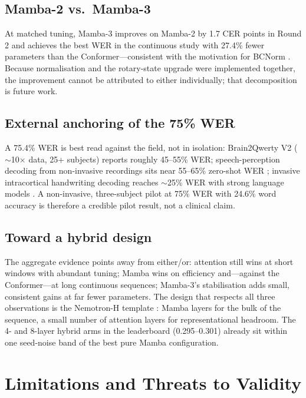 \documentclass[11pt,a4paper]{report}
\begin{document}
\section{Mamba-2 vs.\ Mamba-3}
At matched tuning, Mamba-3 improves on Mamba-2 by 1.7 CER points in Round 2
and achieves the best WER in the continuous study with 27.4\% fewer
parameters than the Conformer---consistent with the motivation for BCNorm
\citep{lahoti2026mamba3}. Because normalisation and the rotary-state upgrade
were implemented together, the improvement cannot be attributed to either
individually; that decomposition is future work.

\section{External anchoring of the 75\% WER}
A 75.4\% WER is best read against the field, not in isolation: Brain2Qwerty
V2 \citep{levy2026brain2qwertyv2} ($\sim$10$\times$ data, 25+ subjects)
reports roughly 45--55\% WER; speech-perception decoding from non-invasive recordings sits
near 55--65\% zero-shot WER \citep{defossez2023decoding}; invasive
intracortical handwriting decoding reaches $\sim$25\% WER with strong
language models \citep{willett2021handwriting}. A non-invasive, three-subject
pilot at 75\% WER with 24.6\% word accuracy is therefore a credible pilot
result, not a clinical claim.

\section{Toward a hybrid design}
The aggregate evidence points away from either/or: attention still wins at
short windows with abundant tuning; Mamba wins on efficiency and---against
the Conformer---at long continuous sequences; Mamba-3's stabilisation adds
small, consistent gains at far fewer parameters. The design that respects
all three observations is the Nemotron-H template \citep{nvidia2025nemotronh}:
Mamba layers for the bulk of the sequence, a small number of attention
layers for representational headroom. The 4- and 8-layer hybrid arms in the
leaderboard (0.295--0.301) already sit within one seed-noise band of the
best pure Mamba configuration.

\chapter{Limitations and Threats to Validity}
\label{ch:limitations}
\end{document}
